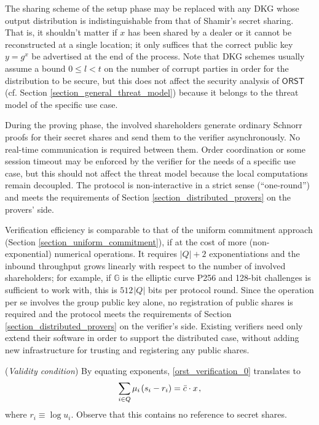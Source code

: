 \documentclass{iacrtrans}
\begin{document}
\noindent
The sharing scheme of the setup phase may be replaced
with any DKG whose output distribution
is indistinguishable from that of Shamir's secret sharing.
That is, it shouldn't matter if $x$ has been shared by a dealer
or it cannot be reconstructed at a single location; it only
suffices that the correct public key
$y = g ^ x$ be advertised at the end of the process.
Note that DKG schemes usually assume a bound $0 \le l < t$
on the number of corrupt parties
in order for the distribution to be secure,
but this does not affect the security analysis of
$\mathsf{ORST}$
(cf. Section \ref{section_general_threat_model})
because it belongs to the threat model of the
specific use case.

During the proving phase,
the involved shareholders generate ordinary Schnorr
proofs for their secret shares
and send them to the verifier asynchronously.
No real-time communication is required between them.
Order coordination or some session timeout
may be enforced by the verifier for the needs of a specific use case,
but this should not affect the threat model
because the local computations remain decoupled.
The protocol is non-interactive in a strict sense
(``one-round'') and meets the requirements of
Section \ref{section_distributed_provers} on the provers' side.

Verification efficiency is comparable to that of the uniform
commitment approach (Section \ref{section_uniform_commitment}),
if at the cost of more (non-exponential) numerical operations.
It requires $|Q| + 2$ exponentiations
and the inbound throughput grows linearly
with respect to the number of involved shareholders;
for example, if $\mathbb{G}$ is the elliptic curve P256 and
128-bit challenges is sufficient to work with,
this is $512 \hspace{1pt} |Q|$ bits per protocol round.
Since the operation per se involves
the group public key alone, no registration of public shares is
required and the protocol meets
the requirements of Section \ref{section_distributed_provers}
on the verifier's side.
Existing verifiers need only extend
their software in order to support the distributed case,
without adding new infrastructure
for trusting and registering any public shares.

\begin{rem}\label{rem_orst_verification_exponents}
(\textit{Validity condition})
By equating exponents,
\eqref{orst_verification_0} translates to
\vspace{5pt}
\begin{equation}\label{orst_verification_exponents}
\sum_{i \in Q} \mu_i\hspace{1pt} (s_i - r_i) =
\bar{c} \cdot x\hspace{1pt},
\vspace{5pt}
\end{equation}
where $r_i \equiv \log u_i$.
Observe that this contains no reference to secret shares.
\end{rem}
\end{document}
